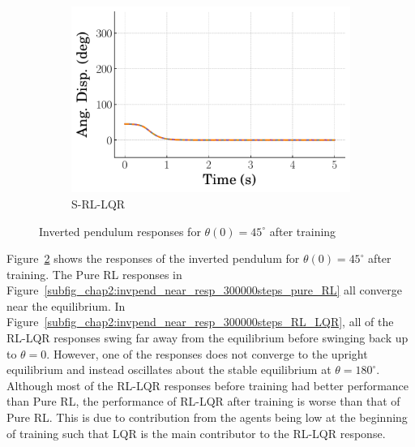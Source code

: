 \begin{figure}[tb]
    \hfill
    \begin{subfigure}[b]{0.49\textwidth}
        \centering
        \includegraphics[width=\textwidth]{figures/figures_RL_model_based_control/time_responses_invpend/invpend_switching/Angular_displacement_45_init_300000_steps.pdf}
        \caption{S-RL-LQR}
        \label{subfig_chap2:invpend_near_resp_300000steps_S_RL_LQR}
    \end{subfigure}
    \caption{Inverted pendulum responses for $\theta(0)=45^{\circ}$ after training}
    \label{fig_chap2:invpend_near_resp_300000steps}
\end{figure}
Figure~\ref{fig_chap2:invpend_near_resp_300000steps} shows the responses of the inverted pendulum for $\theta(0)=45^{\circ}$ after training. The Pure RL responses in Figure~\ref{subfig_chap2:invpend_near_resp_300000steps_pure_RL} all converge near the equilibrium. In Figure~\ref{subfig_chap2:invpend_near_resp_300000steps_RL_LQR}, all of the RL-LQR responses swing far away from the equilibrium before swinging back up to $\theta=0$. However, one of the responses does not converge to the upright equilibrium and instead oscillates about the stable equilibrium at $\theta=180^{\circ}$. Although most of the RL-LQR responses before training had better performance than Pure RL, the performance of RL-LQR after training is worse than that of Pure RL. This is due to contribution from the agents being low at the beginning of training such that LQR is the main contributor to the RL-LQR response.
%
